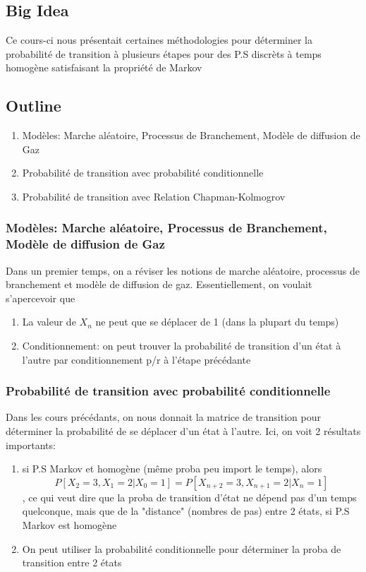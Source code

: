 \documentclass{article}
\begin{document}
\subsection*{Big Idea}

Ce cours-ci nous présentait certaines méthodologies pour déterminer
la probabilité de transition à plusieurs étapes pour des P.S discrèts
à temps homogène satisfaisant la propriété de Markov

\subsection*{Outline}
\begin{enumerate}
    \item Modèles: Marche aléatoire, Processus de Branchement, Modèle de
	diffusion de Gaz
    \item Probabilité de transition avec probabilité conditionnelle
    \item Probabilité de transition avec Relation Chapman-Kolmogrov
\end{enumerate}

\subsubsection{Modèles: Marche aléatoire, Processus de Branchement, Modèle de    diffusion de Gaz}

Dans un premier temps, on a réviser les notions de marche aléatoire,
processus de branchement et  modèle de diffusion de gaz. Essentiellement,
on voulait s'apercevoir que
\begin{enumerate}
    \item La valeur de $X_n$ ne peut que se déplacer de 1 (dans la plupart
	du temps)
    \item Conditionnement: on peut trouver la probabilité de transition
	d'un état à l'autre par conditionnement p/r à l'étape précédante
\end{enumerate}

\subsubsection{Probabilité de transition avec probabilité conditionnelle}

Dans les cours précédants, on nous donnait la matrice de transition pour
déterminer la probabilité de se déplacer d'un état à l'autre. Ici, on
voit 2 résultats importants:
\begin{enumerate}
    \item si P.S Markov et homogène (même proba peu import le temps),
	alors $$ P[X_2 = 3 , X_1 = 2 | X_0 = 1] = P[X_{n+2} = 3, X_{n+1} = 2
	| X_n =1] $$, ce qui veut dire que la proba de transition d'état ne
	dépend pas d'un temps quelconque, mais que de la "distance" (nombres
	de pas) entre 2 états, si P.S Markov est homogène
    \item On peut utiliser la probabilité conditionnelle pour déterminer la
	proba de transition entre 2 états
\end{enumerate}
\end{document}

